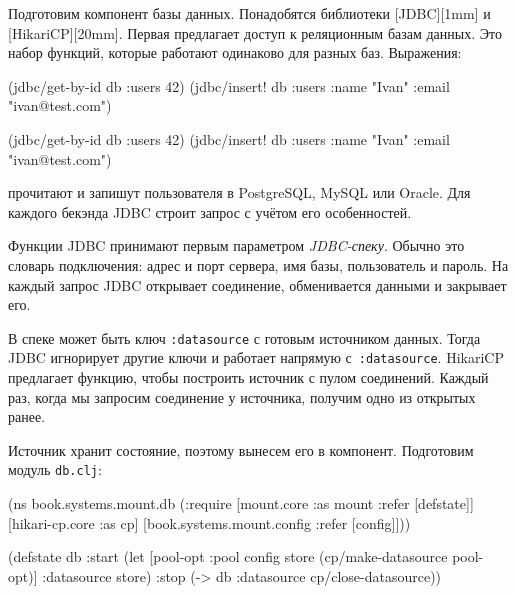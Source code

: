 Подготовим компонент базы данных. Понадобятся библиотеки
[JDBC][1mm] и
[HikariCP][20mm]. Первая предлагает доступ
к реляционным базам данных. Это набор функций, которые работают одинаково для
разных баз. Выражения:

\ifx\DEVICETYPE\MOBILE

\begin{english}
  \begin{clojure}
(jdbc/get-by-id db :users 42)
(jdbc/insert! db :users
  {:name "Ivan" :email "ivan@test.com"})
  \end{clojure}
\end{english}

\else

\begin{english}
  \begin{clojure}
(jdbc/get-by-id db :users 42)
(jdbc/insert! db :users {:name "Ivan" :email "ivan@test.com"})
  \end{clojure}
\end{english}

\fi

\noindent
прочитают и запишут пользователя в Postgre\-SQL, MySQL или Oracle. Для каждого
бекэнда JDBC строит запрос с учётом его особенностей.


Функции JDBC принимают первым параметром \emph{JDBC-спеку}. Обычно это словарь
подключения: адрес и порт сервера, имя базы, пользователь и пароль. На каждый
запрос JDBC открывает соединение, обменивается данными и закрывает его.

В спеке может быть ключ \verb|:datasource| с готовым источником данных. Тогда
JDBC игнорирует другие ключи и работает напрямую с~\verb|:datasource|. HikariCP
предлагает функцию, чтобы построить источник с пулом соединений. Каждый раз,
когда мы запросим соединение у источника, получим одно из открытых ранее.


Источник хранит состояние, поэтому вынесем его в компонент. Подготовим модуль
\verb|db.clj|:

\ifx\DEVICETYPE\MOBILE

\begin{english}
  \begin{clojure}
(ns book.systems.mount.db
  (:require
   [mount.core :as mount
    :refer [defstate]]
   [hikari-cp.core :as cp]
   [book.systems.mount.config
    :refer [config]]))

(defstate db
  :start
  (let [{pool-opt :pool} config
        store (cp/make-datasource
                pool-opt)]
    {:datasource store})
  :stop
  (-> db
      :datasource
      cp/close-datasource))
  \end{clojure}
\end{english}

